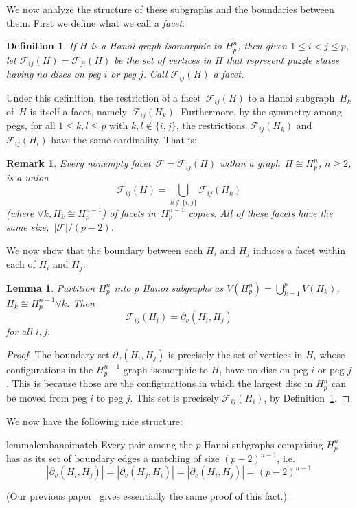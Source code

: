 \documentclass[
final
]{dmtcs-episciences}
\newcommand{\edgeh}[2]{\partial_e(#1,#2)}
\newcommand{\bdryh}[2]{\partial_v(#1,#2)}
\newcommand{\faceth}[1]{\mathcal{F}_{#1}}
\newtheorem{definition}[theorem]{Definition}
\newtheorem{lemma}[theorem]{Lemma}
\newtheorem{remark}[theorem]{Remark}
\begin{document}
We now analyze the structure of these subgraphs and the boundaries between them. First we define what we call a \emph{facet}:
\begin{definition}
\label{def:faceth}
If $H$ is a Hanoi graph isomorphic to $H_p^n$, then given $1 \leq i < j \leq p$, let $\faceth{ij}(H) = \faceth{ji}(H)$ be the set of vertices in $H$ that represent puzzle states having no discs on peg $i$ or peg $j$. Call $\faceth{ij}(H)$ a \emph{facet}.
\end{definition}
Under this definition, the restriction of a facet~$\faceth{ij}(H)$ to a Hanoi subgraph~$H_k$ of~$H$ is itself a facet, namely~$\faceth{ij}(H_k)$. Furthermore, by the symmetry among pegs, for all $1 \leq k,l \leq p$ with $k, l \notin \{i,j\}$, the restrictions~$\faceth{ij}(H_k)$ and~$\faceth{ij}(H_l)$ have the same cardinality. That is:
\begin{remark}
\label{rmk:facetdecomp}
Every nonempty facet~$\mathcal{F} = \faceth{ij}(H)$ within a graph~$H \cong H_p^n$, $n \geq 2$, is a union 
\[\mathcal{F}_{ij}(H) = \bigcup_{k\notin\{i,j\}}\faceth{ij}(H_k)\]
(where $\forall k, H_k\cong H_p^{n-1}$) of facets in~$H_p^{n-1}$ copies. All of these facets have the same size,~$|\mathcal{F}|/(p-2)$.
\end{remark}

We now show that the boundary between each $H_i$ and $H_j$ induces a facet within each of $H_i$ and $H_j$:
\begin{lemma}
\label{lem:facetbdry}
Partition $H_p^n$ into $p$ Hanoi subgraphs as $V(H_p^n) = \bigcup_{k=1}^p V(H_k)$, $H_k \cong H_p^{n-1} \forall k$. Then 
\[\faceth{ij}(H_i) = \bdryh{H_i}{H_j}\] 
for all $i,j$.
\end{lemma}
\begin{proof}
The boundary set $\bdryh{H_i}{H_j}$ is precisely the set of vertices in $H_i$ whose configurations in the $H_p^{n-1}$ graph isomorphic to $H_i$ have no disc on peg $i$ or peg $j$. This is because those are the configurations in which the largest disc in $H_p^n$ can be moved from peg $i$ to peg $j$. This set is precisely $\faceth{ij}(H_i)$, by Definition~\ref{def:faceth}.
\end{proof}

We now have the following nice structure:
\begin{restatable}{lemma}{lemhanoimatch}
\label{lem:hanoimatch}
Every pair among the $p$ Hanoi subgraphs comprising $H_p^n$ has as its set of boundary edges a matching of size $(p-2)^{n-1}$, i.e.
    \[
    |\bdryh{H_i}{H_j}| = |\bdryh{H_j}{H_i}| = |\edgeh{H_i}{H_j}| = (p-2)^{n-1}
    \]
\end{restatable}
(Our previous paper~\cite{hanoitw} gives essentially the same proof of this fact.)
\end{document}
